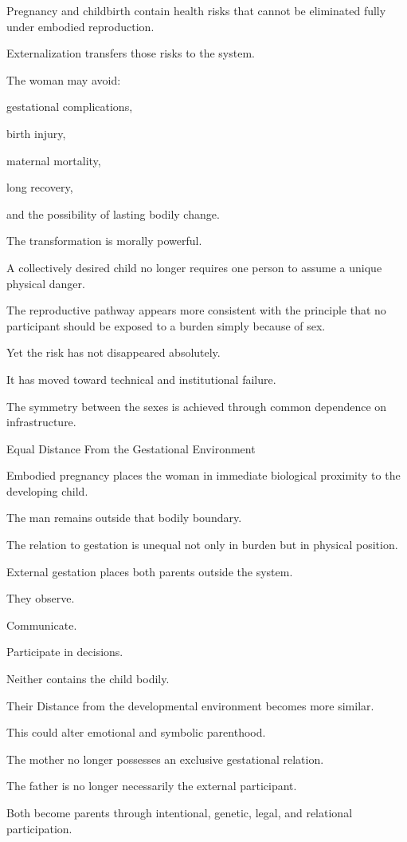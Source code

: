 Pregnancy and childbirth contain health risks that cannot be eliminated fully under embodied reproduction.

Externalization transfers those risks to the system.

The woman may avoid:

gestational complications,

birth injury,

maternal mortality,

long recovery,

and the possibility of lasting bodily change.

The transformation is morally powerful.

A collectively desired child no longer requires one person to assume a unique physical danger.

The reproductive pathway appears more consistent with the principle that no participant should be exposed to a burden simply because of sex.

Yet the risk has not disappeared absolutely.

It has moved toward technical and institutional failure.

The symmetry between the sexes is achieved through common dependence on infrastructure.

Equal Distance From the Gestational Environment

Embodied pregnancy places the woman in immediate biological proximity to the developing child.

The man remains outside that bodily boundary.

The relation to gestation is unequal not only in burden but in physical position.

External gestation places both parents outside the system.

They observe.

Communicate.

Participate in decisions.

Neither contains the child bodily.

Their Distance from the developmental environment becomes more similar.

This could alter emotional and symbolic parenthood.

The mother no longer possesses an exclusive gestational relation.

The father is no longer necessarily the external participant.

Both become parents through intentional, genetic, legal, and relational participation.


